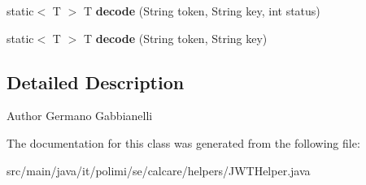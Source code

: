 \begin{DoxyCompactItemize}
\item 
\hypertarget{classit_1_1polimi_1_1se_1_1calcare_1_1helpers_1_1JWTHelper_a1e4e73764660e4849b1b91059ef00982}{}static$<$ T $>$ T {\bfseries decode} (String token, String key, int status)\label{classit_1_1polimi_1_1se_1_1calcare_1_1helpers_1_1JWTHelper_a1e4e73764660e4849b1b91059ef00982}

\item 
\hypertarget{classit_1_1polimi_1_1se_1_1calcare_1_1helpers_1_1JWTHelper_ac06dbf2975d6331717b4ae4775ffa8e1}{}static$<$ T $>$ T {\bfseries decode} (String token, String key)\label{classit_1_1polimi_1_1se_1_1calcare_1_1helpers_1_1JWTHelper_ac06dbf2975d6331717b4ae4775ffa8e1}

\end{DoxyCompactItemize}


\subsection{Detailed Description}
\begin{DoxyAuthor}{Author}
Germano Gabbianelli 
\end{DoxyAuthor}


The documentation for this class was generated from the following file\+:\begin{DoxyCompactItemize}
\item 
src/main/java/it/polimi/se/calcare/helpers/J\+W\+T\+Helper.\+java\end{DoxyCompactItemize}
